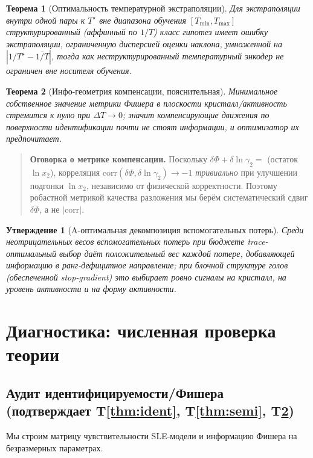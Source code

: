 \documentclass[11pt]{article}
\theoremstyle{plain}
\newtheorem{theorem}{Теорема}
\newtheorem{proposition}{Утверждение}
\theoremstyle{definition}
\newcommand{\lnx}{\ln x_2}
\newcommand{\lng}{\ln\gamma_2}
\begin{document}
\begin{theorem}[Оптимальность температурной экстраполяции]\label{thm:temp}
Для экстраполяции внутри одной пары к $T^\star$ вне диапазона обучения
$[T_{\min},T_{\max}]$ структурированный (аффинный по $1/T$) класс гипотез имеет
ошибку экстраполяции, ограниченную дисперсией оценки наклона, умноженной на
$|1/T^\star-\overline{1/T}|$, тогда как неструктурированный температурный энкодер
не ограничен вне носителя обучения.
\end{theorem}

\begin{theorem}[Инфо-геометрия компенсации, пояснительная]\label{thm:geom}
Минимальное собственное значение метрики Фишера в плоскости кристалл/активность
стремится к нулю при $\Delta T\to0$; значит компенсирующие движения по
поверхности идентификации почти не стоят информации, и оптимизатор их предпочитает.
\end{theorem}

\begin{quote}\textbf{Оговорка о метрике компенсации.} Поскольку
$\delta\Phi+\delta\lng=$ (остаток $\lnx$), корреляция
$\mathrm{corr}(\delta\Phi,\delta\lng)\to-1$ \emph{тривиально} при улучшении
подгонки $\lnx$, независимо от физической корректности. Поэтому робастной метрикой
качества разложения мы берём систематический сдвиг $\overline{\delta\Phi}$, а не
$|\mathrm{corr}|$.\end{quote}

\begin{proposition}[A-оптимальная декомпозиция вспомогательных потерь]\label{prop:aopt}
Среди неотрицательных весов вспомогательных потерь при бюджете trace-оптимальный
выбор даёт положительный вес каждой потере, добавляющей информацию в
ранг-дефицитное направление; при блочной структуре голов (обеспеченной
stop-gradient) это выбирает ровно сигналы на кристалл, на уровень активности и на
форму активности.
\end{proposition}

\section{Диагностика: численная проверка теории}
\label{sec:diag}

\subsection{Аудит идентифицируемости/Фишера (подтверждает T\ref{thm:ident}, T\ref{thm:semi}, T\ref{thm:geom})}
Мы строим матрицу чувствительности SLE-модели и информацию Фишера на
безразмерных параметрах.
\end{document}

